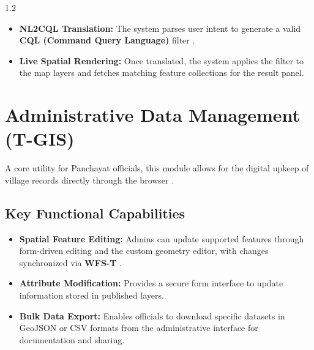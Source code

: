 \begin{spacing}{1.2}
\begin{itemize}
\item \textbf{NL2CQL Translation:} The system parses user intent to generate a valid \textbf{CQL (Command Query Language)} filter \cite{liu2025nalspatial}.

\item \textbf{Live Spatial Rendering:} Once translated, the system applies the filter to the map layers and fetches matching feature collections for the result panel.
\end{itemize}

\section{Administrative Data Management (T-GIS)}

A core utility for Panchayat officials, this module allows for the digital upkeep of village records directly through the browser \cite{smart_panchayat2023}.

\subsection*{Key Functional Capabilities}

\begin{itemize}
\item \textbf{Spatial Feature Editing:} Admins can update supported features through form-driven editing and the custom geometry editor, with changes synchronized via \textbf{WFS-T} \cite{fu2020webgis}.

\item \textbf{Attribute Modification:} Provides a secure form interface to update information stored in published layers.

\item \textbf{Bulk Data Export:} Enables officials to download specific datasets in GeoJSON or CSV formats from the administrative interface for documentation and sharing.
\end{itemize}

\end{spacing}
